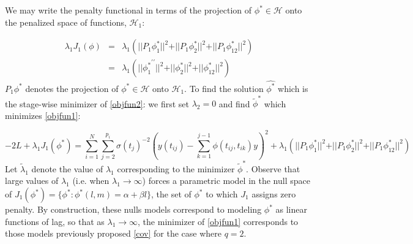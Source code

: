 \documentclass[12pt]{article}
\theoremstyle{definition}
\begin{document}
We may write the penalty functional in terms of the projection of $\phi^* \in \mathcal{H}$ onto the penalized space of functions, $\mathcal{H}_1$:

\begin{eqnarray} 
\lambda_1 J_1\left(\phi\right) &=& \lambda_1 \left(\vert \vert {P_1 \phi_1^*} \vert \vert^2 + \vert \vert {P_1 \phi_2^*} \vert \vert^2 + \vert \vert {P_1 \phi_{12}^*} \vert \vert^2 \right)\\
&=& \lambda_1 \left(\vert \vert {\phi_1^*}^{\prime \prime} \vert \vert^2 + \vert \vert {\phi_2^*} \vert \vert^2 + \vert \vert {\phi_{12}^*} \vert \vert^2 \right) \label{nonstapen}
\end{eqnarray} 
 \noindent
$P_1 \phi^*$ denotes the projection of $\phi^* \in \mathcal{H}$ onto $\mathcal{H}_1$. To find the solution $\hat{\phi^*}$ which is the stage-wise minimizer of \eqref{objfun2}: we first set $\lambda_2 = 0$ and find $\tilde{\phi}^*$ which minimizes \eqref{objfun1}:

\begin{equation}
-2L + \lambda_1 J_1\left(\phi^*\right) = \sum_{i=1}^N \sum_{j=2}^{p_i} \sigma\left({t_j}\right)^{-2} \left(y\left({t_{ij}}\right) - \sum_{k=1}^{j-1}\phi\left({t_{ij},t_{ik}}\right)y\right)^2 + \lambda_1 \left(\vert \vert {P_1 \phi_1^*} \vert \vert^2 + \vert \vert {P_1 \phi_2^*} \vert \vert^2 + \vert \vert {P_1 \phi_{12}^*} \vert \vert^2 \right) \label{stage1obj}
\end{equation}
Let $\tilde{\lambda}_1$ denote the value of $\lambda_1$ corresponding to the minimizer $\tilde{\phi}^*$. Observe that large values of $\lambda_1$ (i.e. when $\lambda_1 \rightarrow \infty$) forces a parametric model in the null space of $J_1\left(\phi^*\right) = \lbrace \phi^*: \phi^*\left(l,m\right) = \alpha + \beta l \rbrace$, the set of $\phi^*$ to which $J_1$ assigns zero penalty. By construction, these nulls models correspond to modeling $\phi^*$ as linear functions of lag, so that as $\lambda_1 \rightarrow \infty$, the minimizer of \eqref{objfun1} corresponds to those models previously proposed \eqref{cov} for the case where $q=2$. 
\end{document}
